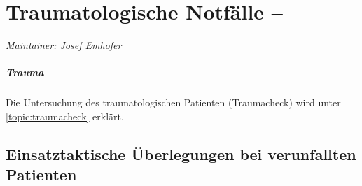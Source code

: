 \chapter{Traumatologische Notfälle -- }

\emph{Maintainer: Josef Emhofer}

\minitoc

\paragraph{Trauma}


Die Untersuchung des traumatologischen Patienten
(Traumacheck) wird unter \ref{topic:traumacheck} erklärt. 

% 




\section{Einsatztaktische Überlegungen bei verunfallten Patienten}

